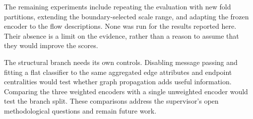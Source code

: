The remaining experiments include repeating the evaluation with new fold partitions, extending the boundary-selected scale range, and adapting the frozen encoder to the flow descriptions. None was run for the results reported here. Their absence is a limit on the evidence, rather than a reason to assume that they would improve the scores.

The structural branch needs its own controls. Disabling message passing and fitting a flat classifier to the same aggregated edge attributes and endpoint centralities would test whether graph propagation adds useful information. Comparing the three weighted encoders with a single unweighted encoder would test the branch split. These comparisons address the supervisor's open methodological questions and remain future work.
